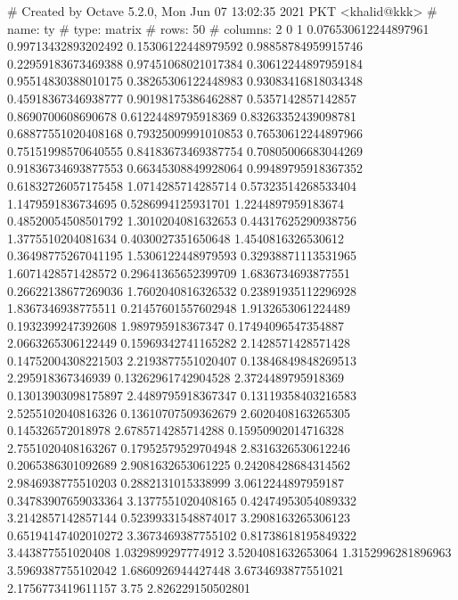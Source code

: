 # Created by Octave 5.2.0, Mon Jun 07 13:02:35 2021 PKT <khalid@kkk>
# name: ty
# type: matrix
# rows: 50
# columns: 2
 0 1
 0.076530612244897961 0.99713432893202492
 0.15306122448979592 0.98858784959915746
 0.22959183673469388 0.97451068021017384
 0.30612244897959184 0.95514830388010175
 0.38265306122448983 0.93083416818034348
 0.45918367346938777 0.90198175386462887
 0.5357142857142857 0.8690700608690678
 0.61224489795918369 0.83263352439098781
 0.68877551020408168 0.79325009991010853
 0.76530612244897966 0.75151998570640555
 0.84183673469387754 0.70805006683044269
 0.91836734693877553 0.66345308849928064
 0.99489795918367352 0.61832726057175458
 1.0714285714285714 0.57323514268533404
 1.1479591836734695 0.5286994125931701
 1.2244897959183674 0.48520054508501792
 1.3010204081632653 0.44317625290938756
 1.3775510204081634 0.4030027351650648
 1.4540816326530612 0.36498775267041195
 1.5306122448979593 0.32938871113531965
 1.6071428571428572 0.29641365652399709
 1.6836734693877551 0.26622138677269036
 1.7602040816326532 0.23891935112296928
 1.8367346938775511 0.21457601557602948
 1.9132653061224489 0.1932399247392608
 1.989795918367347 0.17494096547354887
 2.0663265306122449 0.15969342741165282
 2.1428571428571428 0.14752004308221503
 2.2193877551020407 0.13846849848269513
 2.295918367346939 0.13262961742904528
 2.3724489795918369 0.13013903098175897
 2.4489795918367347 0.13119358403216583
 2.5255102040816326 0.13610707509362679
 2.6020408163265305 0.145326572018978
 2.6785714285714288 0.15950902014716328
 2.7551020408163267 0.17952579529704948
 2.8316326530612246 0.2065386301092689
 2.9081632653061225 0.24208428684314562
 2.9846938775510203 0.2882131015338999
 3.0612244897959187 0.34783907659033364
 3.1377551020408165 0.42474953054089332
 3.2142857142857144 0.52399331548874017
 3.2908163265306123 0.65194147402010272
 3.3673469387755102 0.81738618195849322
 3.443877551020408 1.0329899297774912
 3.5204081632653064 1.3152996281896963
 3.5969387755102042 1.6860926944427448
 3.6734693877551021 2.1756773419611157
 3.75 2.826229150502801


